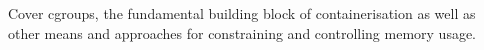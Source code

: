 Cover cgroups, the fundamental building block of containerisation as well as
other means and approaches for constraining and controlling memory usage.\\
